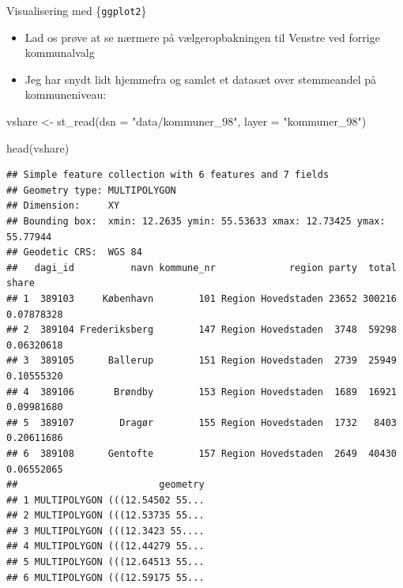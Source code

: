 \documentclass[
  8pt,
  ignorenonframetext,
  aspectratio=169]{beamer}
\newenvironment{Shaded}{}{}
\newcommand{\AttributeTok}[1]{\textcolor[rgb]{0.49,0.56,0.16}{#1}}
\newcommand{\FunctionTok}[1]{\textcolor[rgb]{0.02,0.16,0.49}{#1}}
\newcommand{\NormalTok}[1]{#1}
\newcommand{\OtherTok}[1]{\textcolor[rgb]{0.00,0.44,0.13}{#1}}
\newcommand{\StringTok}[1]{\textcolor[rgb]{0.25,0.44,0.63}{#1}}
\begin{document}
\begin{frame}[fragile]{Visualisering med \{\texttt{ggplot2}\}}
\protect\hypertarget{visualisering-med-ggplot2-1}{}
\begin{itemize}
\item
  Lad os prøve at se nærmere på vælgeropbakningen til Venstre ved
  forrige kommunalvalg
\item
  Jeg har snydt lidt hjemmefra og samlet et datasæt over stemmeandel på
  kommuneniveau:
\end{itemize}

\tiny

\begin{Shaded}
\begin{Highlighting}[]
\NormalTok{vshare }\OtherTok{\textless{}{-}} \FunctionTok{st\_read}\NormalTok{(}\AttributeTok{dsn =} \StringTok{"data/kommuner\_98"}\NormalTok{,}
                  \AttributeTok{layer =} \StringTok{"kommuner\_98"}\NormalTok{)}
\end{Highlighting}
\end{Shaded}

\normalsize

\tiny

\begin{Shaded}
\begin{Highlighting}[]
\FunctionTok{head}\NormalTok{(vshare)}
\end{Highlighting}
\end{Shaded}

\begin{verbatim}
## Simple feature collection with 6 features and 7 fields
## Geometry type: MULTIPOLYGON
## Dimension:     XY
## Bounding box:  xmin: 12.2635 ymin: 55.53633 xmax: 12.73425 ymax: 55.77944
## Geodetic CRS:  WGS 84
##   dagi_id          navn kommune_nr             region party  total      share
## 1  389103     København        101 Region Hovedstaden 23652 300216 0.07878328
## 2  389104 Frederiksberg        147 Region Hovedstaden  3748  59298 0.06320618
## 3  389105      Ballerup        151 Region Hovedstaden  2739  25949 0.10555320
## 4  389106       Brøndby        153 Region Hovedstaden  1689  16921 0.09981680
## 5  389107        Dragør        155 Region Hovedstaden  1732   8403 0.20611686
## 6  389108      Gentofte        157 Region Hovedstaden  2649  40430 0.06552065
##                         geometry
## 1 MULTIPOLYGON (((12.54502 55...
## 2 MULTIPOLYGON (((12.53735 55...
## 3 MULTIPOLYGON (((12.3423 55....
## 4 MULTIPOLYGON (((12.44279 55...
## 5 MULTIPOLYGON (((12.64513 55...
## 6 MULTIPOLYGON (((12.59175 55...
\end{verbatim}

\normalsize
\end{frame}
\end{document}
